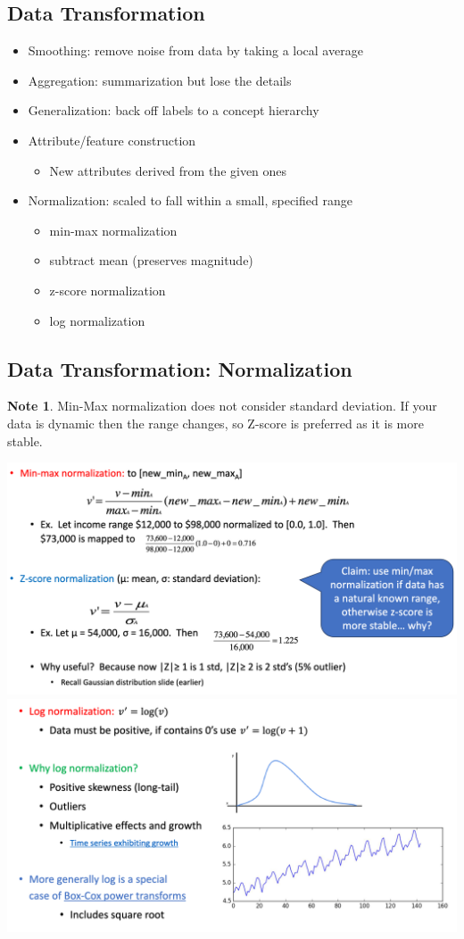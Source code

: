 \documentclass[11pt]{article}
\theoremstyle{definition}
\newtheorem{note}{Note}
\begin{document}
\subsection{Data Transformation}
\begin{itemize}
    \item Smoothing: remove noise from data by taking a local average
    \item Aggregation: summarization but lose the details
    \item Generalization: back off labels to a concept hierarchy
    \item Attribute/feature construction
    \begin{itemize}
        \item New attributes derived from the given ones
    \end{itemize}
    \item Normalization: scaled to fall within a small, specified range
    \begin{itemize}
        \item min-max normalization
        \item subtract mean (preserves magnitude)
        \item z-score normalization
        \item log normalization
    \end{itemize}
\end{itemize}
\subsection{Data Transformation: Normalization}
\begin{note}
    Min-Max normalization does not consider standard deviation. If your data is dynamic then the range changes, so Z-score is preferred as it is more stable.
\end{note}
\includegraphics[width=\textwidth]{18.png}
\includegraphics[width=\textwidth]{19.png}
\end{document}
